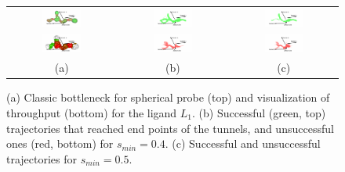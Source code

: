 \documentclass[letterpaper, 10 pt, conference]{ieeeconf} %
\def\smin{s_{min}}
\def\LA{L_1}
\begin{document}
\begin{figure}
\centering
{
\renewcommand{\tabcolsep}{-5pt}
\begin{tabular}{ccc}
\includegraphics[width=0.38\textwidth]{fig/t05proteinBottle2T} & 
\includegraphics[width=0.38\textwidth]{fig/t04goodT} & 
\includegraphics[width=0.38\textwidth]{fig/t05goodT} \\
\includegraphics[width=0.38\textwidth]{fig/t05thpT} &
\includegraphics[width=0.38\textwidth]{fig/t04badT} &
\includegraphics[width=0.38\textwidth]{fig/t05badT} \\ 
(a) & (b) & (c)                       
\end{tabular}                       
\caption{\label{fig::tunnel2}
    (a) Classic bottleneck for spherical probe (top) and visualization of throughput (bottom) for the ligand $\LA$.
    (b) Successful (green, top) trajectories that reached end points of the tunnels,
        and unsuccessful ones (red, bottom) for $\smin=0.4$.
    (c) Successful and unsuccessful trajectories for $\smin=0.5$.
}
}
\end{figure}
\end{document}
